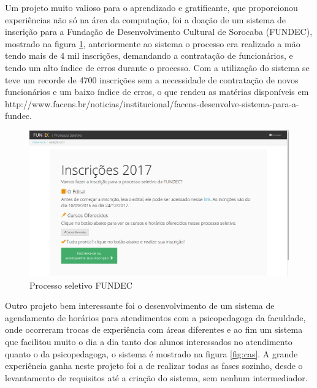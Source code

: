 \documentclass[
	12pt,				%
	oneside,			%
	a4paper,			%
	chapter=TITLE,		%
	section=TITLE,		%
	sumario=tradicional %
	english,			%
	french,				%
	spanish,			%
	brazil				%
	]{abntex2}
\begin{document}
Um projeto muito valioso para o aprendizado e gratificante, que proporcionou experiências não só na área da computação, foi a doação de um sistema de inscrição para a Fundação de Desenvolvimento Cultural de Sorocaba (FUNDEC), mostrado na figura \ref{fig:fundec}, anteriormente ao sistema o processo era realizado a mão tendo mais de 4 mil inscrições, demandando a contratação de funcionários, e tendo um alto índice de erros durante o processo. Com a utilização do sistema se teve um recorde de 4700 inscrições sem a necessidade de contratação de novos funcionários e um baixo índice de erros, o que rendeu as matérias disponíveis em http://www.facens.br/noticias/institucional/facens-desenvolve-sistema-para-a-fundec. 

\begin{figure}[htb]
	\caption{\label{fig:fundec} Processo seletivo FUNDEC}
	\begin{center}
		\includegraphics[scale=0.3]{fundec}
	\end{center}
\end{figure}

Outro projeto bem interessante foi o desenvolvimento de um sistema de agendamento de horários para atendimentos com a psicopedagoga da faculdade, onde ocorreram trocas de experiência com áreas diferentes e ao fim um sistema que facilitou muito o dia a dia tanto dos alunos interessados no atendimento quanto o da psicopedagoga, o sistema é mostrado na figura \ref{fig:cas}. A grande experiência ganha neste projeto foi a de realizar todas as fases sozinho, desde o levantamento de requisitos até a criação do sistema, sem nenhum intermediador.
\end{document}
